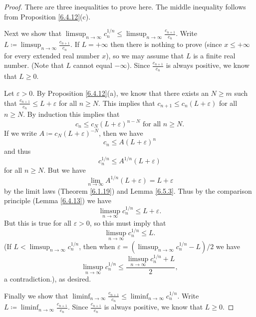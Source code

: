 \begin{proof}
    There are three inequalities to prove here.
    The middle inequality follows from Proposition \ref{6.4.12}(c).

    Next we show that \(\limsup_{n \to \infty} c_n^{1 / n} \leq \limsup_{n \to \infty} \frac{c_{n + 1}}{c_n}\).
    Write \(L \coloneqq \limsup_{n \to \infty} \frac{c_{n + 1}}{c_n}\).
    If \(L = +\infty\) then there is nothing to prove (since \(x \leq +\infty\) for every extended real number \(x\)), so we may assume that \(L\) is a finite real number.
    (Note that \(L\) cannot equal \(-\infty\)).
    Since \(\frac{c_{n + 1}}{c_n}\) is always positive, we know that \(L \geq 0\).

    Let \(\varepsilon > 0\).
    By Proposition \ref{6.4.12}(a), we know that there exists an \(N \geq m\) such that \(\frac{c_{n + 1}}{c_n} \leq L + \varepsilon\) for all \(n \geq N\).
    This implies that \(c_{n + 1} \leq c_n (L + \varepsilon)\) for all \(n \geq N\).
    By induction this implies that
    \[
        c_n \leq c_N (L + \varepsilon)^{n - N} \text{ for all } n \geq N.
    \]
    If we write \(A \coloneqq c_N (L + \varepsilon)^{-N}\), then we have
    \[
        c_n \leq A(L + \varepsilon)^n
    \]
    and thus
    \[
        c_n^{1 / n} \leq A^{1 / n} (L + \varepsilon)
    \]
    for all \(n \geq N\).
    But we have
    \[
        \lim_{n \to \infty} A^{1 / n} (L + \varepsilon) = L + \varepsilon
    \]
    by the limit laws (Theorem \ref{6.1.19}) and Lemma \ref{6.5.3}.
    Thus by the comparison principle (Lemma \ref{6.4.13}) we have
    \[
        \limsup_{n \to \infty} c_n^{1 / n} \leq L + \varepsilon.
    \]
    But this is true for all \(\varepsilon > 0\), so this must imply that
    \[
        \limsup_{n \to \infty} c_n^{1 / n} \leq L.
    \]
    (If \(L < \limsup_{n \to \infty} c_n^{1 / n}\), then when \(\varepsilon = (\limsup_{n \to \infty} c_n^{1 / n} - L) / 2\) we have
    \[
        \limsup_{n \to \infty} c_n^{1 / n} \leq \frac{\limsup_{n \to \infty} c_n^{1 / n} + L}{2},
    \]
    a contradiction.), as desired.

    Finally we show that \(\liminf_{n \to \infty} \frac{c_{n + 1}}{c_n} \leq \liminf_{n \to \infty} c_n^{1 / n}\).
    Write \(L \coloneqq \liminf_{n \to \infty} \frac{c_{n + 1}}{c_n}\).
    Since \(\frac{c_{n + 1}}{c_n}\) is always positive, we know that \(L \geq 0\).


\end{proof}
